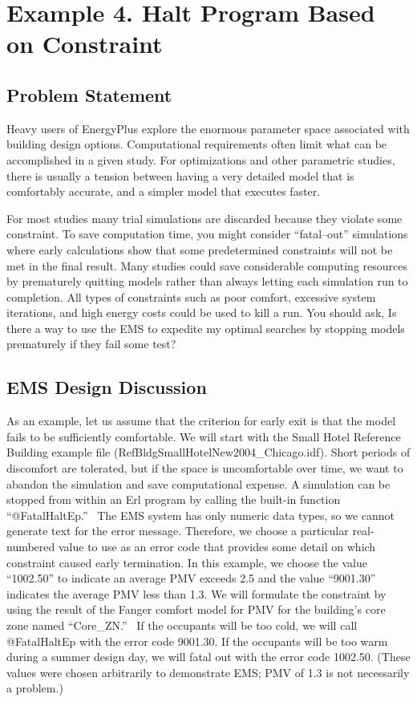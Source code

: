 \section{Example 4. Halt Program Based on Constraint}\label{example-4.-halt-program-based-on-constraint}

\subsection{Problem Statement}\label{problem-statement-006}

Heavy users of EnergyPlus explore the enormous parameter space associated with building design options. Computational requirements often limit what can be accomplished in a given study. For optimizations and other parametric studies, there is usually a tension between having a very detailed model that is comfortably accurate, and a simpler model that executes faster.

For most studies many trial simulations are discarded because they violate some constraint. To save computation time, you might consider ``fatal--out'' simulations where early calculations show that some predetermined constraints will not be met in the final result. Many studies could save considerable computing resources by prematurely quitting models rather than always letting each simulation run to completion. All types of constraints such as poor comfort, excessive system iterations, and high energy costs could be used to kill a run. You should ask, Is there a way to use the EMS to expedite my optimal searches by stopping models prematurely if they fail some test?

\subsection{EMS Design Discussion}\label{ems-design-discussion-006}

As an example, let us assume that the criterion for early exit is that the model fails to be sufficiently comfortable. We will start with the Small Hotel Reference Building example file (RefBldgSmallHotelNew2004\_Chicago.idf). Short periods of discomfort are tolerated, but if the space is uncomfortable over time, we want to abandon the simulation and save computational expense. A simulation can be stopped from within an Erl program by calling the built-in function ``@FatalHaltEp.''~ The EMS system has only numeric data types, so we cannot generate text for the error message. Therefore, we choose a particular real-numbered value to use as an error code that provides some detail on which constraint caused early termination. In this example, we choose the value ``1002.50'' to indicate an average PMV exceeds 2.5 and the value ``9001.30'' indicates the average PMV less than 1.3. We will formulate the constraint by using the result of the Fanger comfort model for PMV for the building's core zone named ``Core\_ZN.''~ If the occupants will be too cold, we will call @FatalHaltEp with the error code 9001.30. If the occupants will be too warm during a summer design day, we will fatal out with the error code 1002.50. (These values were chosen arbitrarily to demonstrate EMS; PMV of 1.3 is not necessarily a problem.)

